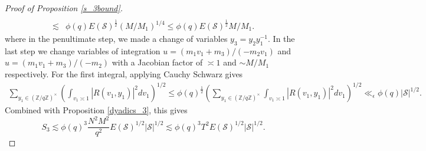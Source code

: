 \begin{proof}[{Proof of Proposition \ref{s_3bound}}]
\begin{align*}
       \\ \lesssim&
       \phi(q)E(\mathcal{S})^{\frac{1}{2}}(M/M_1)^{1/4}\leq\phi(q)E(\mathcal{S})^{\frac{1}{2}}M/M_1.
       \end{align*}
       where in the penultimate step, we made a change of variables $y_3=y_2y_1^{-1}$. In the last step we change variables of integration $u=(m_1v_1+m_3)/(-m_2v_1)$ and $u=(m_1v_1+m_3)/(-m_2)$ with a Jacobian factor of $\asymp 1$ and $\sim M/M_1$ respectively. 
       For the first integral, applying Cauchy Schwarz gives \begin{align*}
        \sum_{y_1\in (\mathbb{Z}/q\mathbb{Z})^\times} \left(\int_{v_1\asymp 1} 
        \left|R\left(v_1,y_1\right)\right|^2dv_1\right)^{1/2} 
        \leq  \phi(q)^{\frac{1}{2}}\left(\sum_{y_1\in (\mathbb{Z}/q\mathbb{Z})^\times} \int_{v_1\asymp 1} 
        \left|R\left(v_1,y_1\right)\right|^2dv_1\right)^{1/2} 
        \ll_{\epsilon}\phi(q) |\mathcal{S}|^{1/2}.
       \end{align*}
       Combined with Proposition \ref{dyadics_3}, this gives \[
       S_3 \lesssim \phi(q)^3\frac{N^2M^2}{q^2} E(\mathcal{S})^{1/2} |\mathcal{S}|^{1/2} \lesssim  \phi(q)^3 T^2 E(\mathcal{S})^{1/2} |\mathcal{S}|^{1/2}.
       \]
\end{proof}

